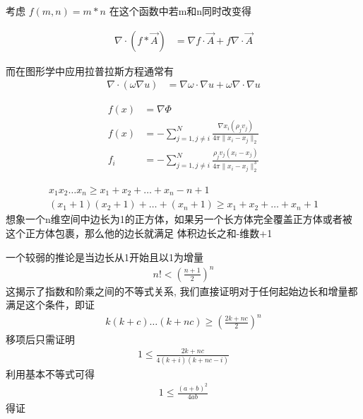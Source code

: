 \begin{thm}[乘积的Operand操作数的变化对结果的影响]
		考虑 $ f(m,n)= m*n $ 在这个函数中若m和n同时改变得
\end{thm}

\begin{thm}[向量乘积的微分法则]
		\begin{align*}
				\nabla \cdot (f*\vec A) &=\nabla f\cdot \vec A+f\nabla \cdot \vec A
		\end{align*}

		而在图形学中应用拉普拉斯方程通常有
		\begin{align*}
				\nabla \cdot (\omega \nabla u) &= \nabla \omega \cdot \nabla u + \omega\nabla \cdot  \nabla u     
		\end{align*}
\end{thm}
\begin{thm}[计算万有引力势能]
	\begin{align*}
			f(x) &=  \nabla \Phi \\
			f(x) &=  -\sum_{j=1,j\neq i}^{N}\frac{ \nabla x_i (\rho_j v_j) }{4\pi \|x_i -x_j\|_2} \\
			f_i &= - \sum_{j=1,j\neq i}^{N} \frac{\rho_j v_j(x_i-x_j)}{4\pi \|x_i-x_j\|_2^3}  
	\end{align*}	
\end{thm}
\begin{thm}[伯努利不等式(体积>=边长之和-维数+1]
	\begin{align*}
			x_1 x_2\ldots x_{n} \ge x_1+x_2+\ldots+x_{n} - n+1 \\
			(x_1+1)(x_2+1)+\ldots+(x_{n}+1) \ge x_1+x_2+\ldots+x_{n} +1
	\end{align*}	
	想象一个n维空间中边长为1的正方体，如果另一个长方体完全覆盖正方体或者被这个正方体包裹，那么他的边长就满足
	体积\ge 边长之和-维数+1
\end{thm}
\begin{thm}
		一个较弱的推论是当边长从1开始且以1为增量
	\begin{align*}
			n!<(\frac{n+1}{2} )^n 
	\end{align*}	
	这揭示了指数和阶乘之间的不等式关系,
	我们直接证明对于任何起始边长和增量都满足这个条件，即证
	\begin{align*}
		k(k+c)\ldots(k+nc)\ge (\frac{2k+nc}{2})^n
	\end{align*}
	移项后只需证明
	\begin{align*}
			1\le \frac{2k+nc }{4(k+i)(k+nc-i)} 
	\end{align*}
	利用基本不等式可得
	\begin{align*}
			1\le \frac{\left( a+b \right) ^2}{4ab} 
	\end{align*}
	得证
\end{thm}


\ifx\allfiles\undefined

\fi
